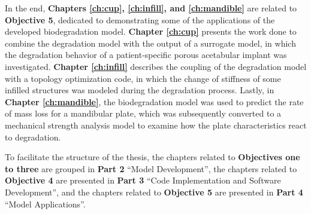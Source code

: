In the end, \textbf{Chapters \ref{ch:cup}, \ref{ch:infill}, and \ref{ch:mandible}} are related to \textbf{Objective 5}, dedicated to demonstrating some of the applications of the developed biodegradation model. \textbf{Chapter \ref{ch:cup}} presents the work done to combine the degradation model with the output of a surrogate model, in which the degradation behavior of a patient-specific porous acetabular implant was investigated. \textbf{Chapter \ref{ch:infill}} describes the coupling of the degradation model with a topology optimization code, in which the change of stiffness of some infilled structures was modeled during the degradation process. Lastly, in \textbf{Chapter \ref{ch:mandible}}, the biodegradation model was used to predict the rate of mass loss for a mandibular plate, which was subsequently converted to a mechanical strength analysis model to examine how the plate characteristics react to degradation. 

To facilitate the structure of the thesis, the chapters related to \textbf{Objectives one to three} are grouped in \textbf{Part 2} ``Model Development'', the chapters related to \textbf{Objective 4} are presented in \textbf{Part 3} ``Code Implementation and Software Development'', and the chapters related to \textbf{Objective 5} are presented in \textbf{Part 4} ``Model Applications''.

\cleardoublepage
